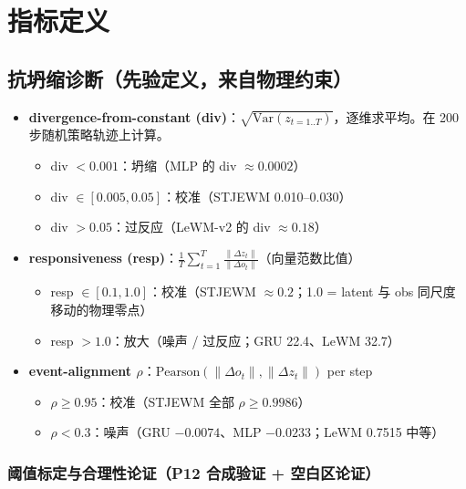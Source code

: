 \documentclass[11pt,a4paper]{article}
\begin{document}
\section{指标定义}

\subsection{抗坍缩诊断（先验定义，来自物理约束）}

\begin{itemize}[leftmargin=2em]
    \item \textbf{divergence-from-constant (div)}：$\sqrt{\text{Var}(z_{t=1..T})}$，逐维求平均。在 200 步随机策略轨迹上计算。
    \begin{itemize}
        \item div $< 0.001$：坍缩（MLP 的 div $\approx 0.0002$）
        \item div $\in [0.005, 0.05]$：校准（STJEWM 0.010--0.030）
        \item div $> 0.05$：过反应（LeWM-v2 的 div $\approx 0.18$）
    \end{itemize}
    \item \textbf{responsiveness (resp)}：$\frac{1}{T} \sum_{t=1}^{T} \frac{\|\Delta z_t\|}{\|\Delta o_t\|}$（向量范数比值）
    \begin{itemize}
        \item resp $\in [0.1, 1.0]$：校准（STJEWM $\approx 0.2$；1.0 = latent 与 obs 同尺度移动的物理零点）
        \item resp $> 1.0$：放大（噪声 / 过反应；GRU 22.4、LeWM 32.7）
    \end{itemize}
    \item \textbf{event-alignment \ensuremath{\rho}}：$\text{Pearson}(\|\Delta o_t\|, \|\Delta z_t\|)$ per step
    \begin{itemize}
        \item $\rho \geq 0.95$：校准（STJEWM 全部 $\rho \geq 0.9986$）
        \item $\rho < 0.3$：噪声（GRU $-0.0074$、MLP $-0.0233$；LeWM 0.7515 中等）
    \end{itemize}
\end{itemize}

\subsubsection{阈值标定与合理性论证（P12 合成验证 + 空白区论证）}
\end{document}
